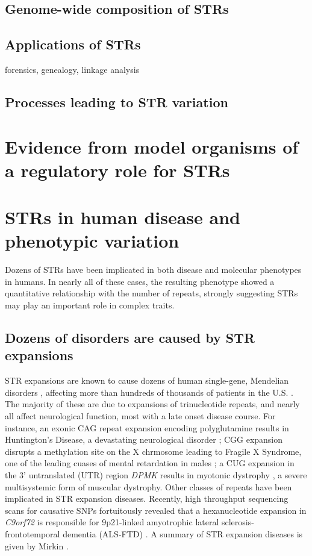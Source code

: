 \subsection{Genome-wide composition of STRs}
\subsection{Applications of STRs}
forensics, genealogy, linkage analysis
\subsection{Processes leading to STR variation}

\section{Evidence from model organisms of a regulatory role for STRs}

\section{STRs in human disease and phenotypic variation}
Dozens of STRs have been implicated in both disease and molecular phenotypes in humans. In nearly all of these cases, the resulting phenotype showed a quantitative relationship with the number of repeats, strongly suggesting STRs may play an important role in complex traits.

\subsection{Dozens of disorders are caused by STR expansions}
STR expansions are known to cause dozens of human single-gene, Mendelian disorders \cite{Mirkin2007}, affecting more than hundreds of thousands of patients in the U.S. \cite{CoffeeKeithAlbizuaEtAl2009}. The majority of these are due to expansions of trinucleotide repeats, and nearly all affect neurological function, most with a late onset disease course. For instance, an exonic CAG repeat expansion encoding polyglutamine results in Huntington's Disease, a devastating neurological disorder \cite{Mirkin2007}; CGG expansion disrupts a methylation site on the X chrmosome leading to Fragile X Syndrome, one of the leading cuases of mental retardation in males \cite{LyonLaverYuEtAl2010}; a CUG expansion in the 3' untranslated (UTR) region \emph{DPMK} results in myotonic dystrophy \cite{BrookMcCurrachHarleyEtAl1992}, a severe multisystemic form of muscular dystrophy. 
Other classes of repeats have been implicated in STR expansion diseases. Recently, high throughput sequencing scans for causative SNPs fortuitously revealed that a hexanucleotide expansion in \emph{C9orf72} is responsible for 9p21-linked amyotrophic lateral sclerosis-frontotemporal dementia (ALS-FTD) \cite{RentonMajounieWaiteEtAl}. A summary of STR expansion diseases is given by Mirkin \cite{Mirkin2007}. %

